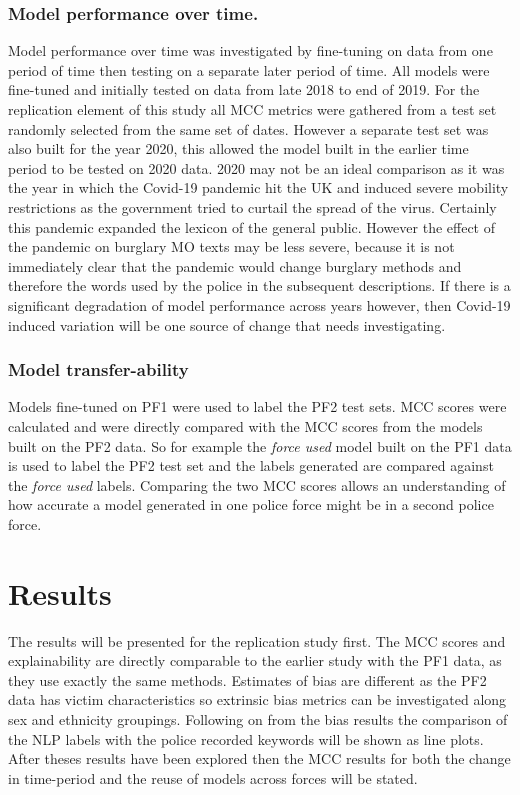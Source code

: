 \subsubsection{Model performance over time.} Model performance over time was investigated by fine-tuning on data from one period of time then testing on a separate later period of time. All models were fine-tuned and initially tested on data  from late 2018 to end of 2019. For the replication element of this study all MCC metrics were gathered from a test set randomly selected from the same set of dates. However a separate test set was also built for the year 2020, this allowed the model built in the earlier time period to be tested on 2020 data. 2020 may not be an ideal comparison as it  was the year in which the Covid-19 pandemic hit the UK and induced severe mobility restrictions as the government tried to curtail the spread of the virus. Certainly this pandemic expanded the lexicon of the general public. However the effect of the pandemic on burglary MO texts may be less severe, because it is not immediately clear that the pandemic would change burglary methods and therefore the words used by the police in the subsequent descriptions. If there is a significant degradation of model performance across years however, then Covid-19 induced variation will be one source of change that needs investigating.     

\subsubsection{Model transfer-ability} Models fine-tuned on PF1 were used to label the PF2 test sets. MCC scores were calculated and were directly compared with the MCC scores from the models built on the PF2 data. So for example the \emph{force used} model built on the PF1 data is used to label the PF2 test set and the labels generated are compared against the \emph{force used} labels. Comparing the two MCC scores allows an understanding of how accurate a model generated in one police force might be in a second police force. 

\section{Results} The results will be presented for the replication study first. The MCC scores and explainability are directly comparable to the earlier study with the PF1 data, as they use exactly the same methods. Estimates of bias are different as the PF2 data has victim characteristics so extrinsic bias metrics can be investigated along sex and ethnicity groupings. Following on from the bias results the comparison of the NLP labels with the police recorded keywords will be shown as line plots. After theses results have been explored then the MCC results for both the change in time-period and the reuse of models across forces will be stated.

